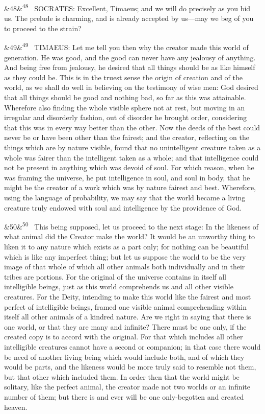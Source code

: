 \documentclass[12pt]{article}
\newcommand{\para}[1][]{\par\noindent\ifx&#1&\else\textsuperscript{\footnotesize #1}~\fi}
\begin{document}
\para[48] SOCRATES: Excellent, Timaeus; and we will do precisely as you bid us. The prelude is charming, and is already accepted by us---may we beg of you to proceed to the strain?

\para[49] TIMAEUS: Let me tell you then why the creator made this world of generation. He was good, and the good can never have any jealousy of anything. And being free from jealousy, he desired that all things should be as like himself as they could be. This is in the truest sense the origin of creation and of the world, as we shall do well in believing on the testimony of wise men: God desired that all things should be good and nothing bad, so far as this was attainable. Wherefore also finding the whole visible sphere not at rest, but moving in an irregular and disorderly fashion, out of disorder he brought order, considering that this was in every way better than the other. Now the deeds of the best could never be or have been other than the fairest; and the creator, reflecting on the things which are by nature visible, found that no unintelligent creature taken as a whole was fairer than the intelligent taken as a whole; and that intelligence could not be present in anything which was devoid of soul. For which reason, when he was framing the universe, he put intelligence in soul, and soul in body, that he might be the creator of a work which was by nature fairest and best. Wherefore, using the language of probability, we may say that the world became a living creature truly endowed with soul and intelligence by the providence of God.

\para[50] This being supposed, let us proceed to the next stage: In the likeness of what animal did the Creator make the world? It would be an unworthy thing to liken it to any nature which exists as a part only; for nothing can be beautiful which is like any imperfect thing; but let us suppose the world to be the very image of that whole of which all other animals both individually and in their tribes are portions. For the original of the universe contains in itself all intelligible beings, just as this world comprehends us and all other visible creatures. For the Deity, intending to make this world like the fairest and most perfect of intelligible beings, framed one visible animal comprehending within itself all other animals of a kindred nature. Are we right in saying that there is one world, or that they are many and infinite? There must be one only, if the created copy is to accord with the original. For that which includes all other intelligible creatures cannot have a second or companion; in that case there would be need of another living being which would include both, and of which they would be parts, and the likeness would be more truly said to resemble not them, but that other which included them. In order then that the world might be solitary, like the perfect animal, the creator made not two worlds or an infinite number of them; but there is and ever will be one only-begotten and created heaven.
\end{document}
